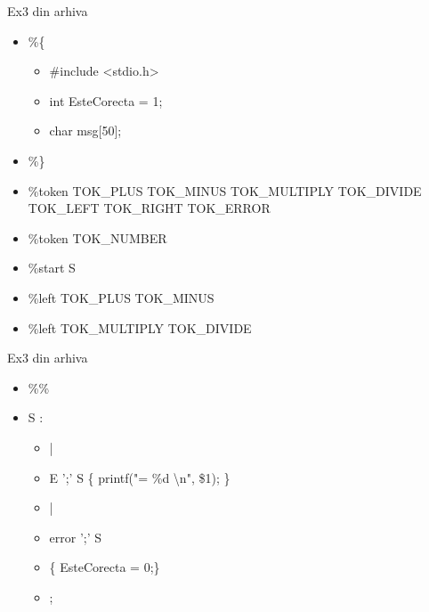 \documentclass[pdf]{beamer}
\begin{document}
\begin{frame}{Ex3 din arhiva}
\begin{itemize}
\item[]
	\%\{
	
	\begin{itemize}
		\item[]
		\#include <stdio.h>
		
		\item[]
		int EsteCorecta = 1;

		\item[]
		char msg[50];

	\end{itemize}
	
	\item[]
	\%\}
		\linebreak

	\item[]
	\%token TOK\_PLUS TOK\_MINUS TOK\_MULTIPLY TOK\_DIVIDE TOK\_LEFT TOK\_RIGHT TOK\_ERROR

	\item[]
	\%token TOK\_NUMBER
		\linebreak

	\item[]
	\%start S
		\linebreak

	\item[]
	\%left TOK\_PLUS TOK\_MINUS

	\item[]
	\%left TOK\_MULTIPLY TOK\_DIVIDE


\end{itemize}
\end{frame}



\begin{frame}{Ex3 din arhiva}
\begin{itemize}
	\item[]
	 \%\%
	
	\item[]
	S :
	
	\begin{itemize}
		\item[]
		|

		\item[]
		E ';' S \{ printf("= \%d \textbackslash n", \$1); \}
		
		\item[]
		|

		\item[]
		error ';' S
		
		\item[]
		\hspace{0.5cm}\{ EsteCorecta = 0;\}

		\item[]
		;
	\end{itemize}

\end{itemize}
\end{frame}
\end{document}
